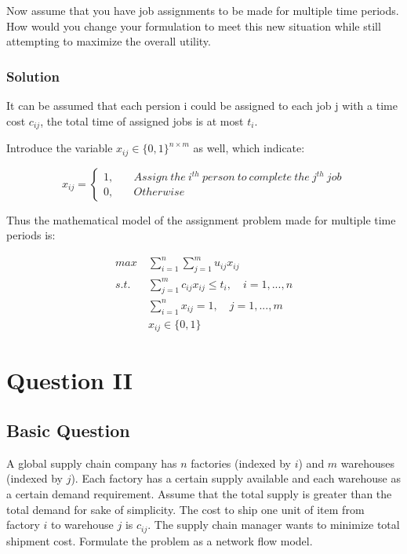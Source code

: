 \documentclass[11pt]{article}
\begin{document}
Now assume that you have job assignments to be made for multiple time
periods. How would you change your formulation to meet this new
situation while still attempting to maximize the overall utility.

\hypertarget{solution}{%
\subsubsection{Solution}\label{solution}}

It can be assumed that each persion i could be assigned to each job j
with a time cost \(c_{ij}\), the total time of assigned jobs is at most
\(t_{i}\).

Introduce the variable \(x_{ij} \in \{0,1 \}^{n\times m}\) as well,
which indicate:

\[x_{ij}=\begin{cases}1,\quad &Assign\ the\ i^{th}\ person\ to\ complete\ the\ j^{th}\ job\\0,\quad &Otherwise \end{cases}\]

Thus the mathematical model of the assignment problem made for multiple
time periods is:

\[ \begin{align*} max\ &  \sum_{i=1}^n \sum_{j=1}^m u_{ij} x_{ij} 
\\ s.t. & \sum_{j=1}^m c_{ij} x_{ij}\leq t_i,  \quad i=1,...,n
\\   & \sum_{i=1}^n x_{ij}= 1, \quad j=1,...,m
\\ & x_{ij}\in \{0,1\} \end{align*}\]

    \hypertarget{question-ii}{%
\section{Question II}\label{question-ii}}

\hypertarget{basic-question}{%
\subsection{Basic Question}\label{basic-question}}

A global supply chain company has \(n\) factories (indexed by \(i\)) and
\(m\) warehouses (indexed by \(j\)). Each factory has a certain supply
available and each warehouse as a certain demand requirement. Assume
that the total supply is greater than the total demand for sake of
simplicity. The cost to ship one unit of item from factory \(i\) to
warehouse \(j\) is \(c_{ij}\). The supply chain manager wants to
minimize total shipment cost. Formulate the problem as a network flow
model.
\end{document}
